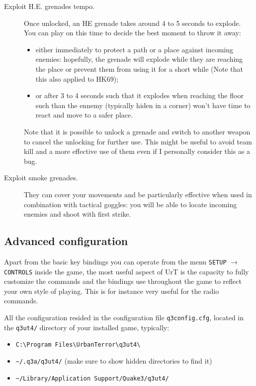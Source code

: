 \begin{description}
\item[Exploit H.E. grenades tempo.] 
  Once unlocked, an HE grenade takes around 4 to 5 seconds to explode. You can
  play on this time to decide the best moment to throw it away:
  \begin{itemize}
  \item either immediately to protect a path or a place against incoming
    enemies: hopefully, the grenade will explode while they are reaching the
    place or prevent them from using it for a short while (Note that this also
    applied to HK69);  
  \item or after 3 to 4 seconds such that it explodes when reaching the floor
    such than the ennemy (typically hiden in a corner) won't have time to react
    and move to a safer place.   
  \end{itemize}
  Note that it is possible to unlock a grenade and switch to another weapon to
  cancel the unlocking for further use. This might be useful to avoid team kill
  and a more effective use of them even if I personally consider this as a bug.    
\item[Exploit smoke grenades.] They can cover your movements and be particularly
  effective when used in combination with tactical goggles: you will be able to
  locate incoming enemies and shoot with first strike.    
\end{description}


\subsection{Advanced configuration}
\label{sec:client:config}

Apart from the basic key bindings you can operate from the menu \texttt{SETUP}
$\rightarrow$ \texttt{CONTROLS} inside the game, the most useful aspect of UrT
is the capacity to fully customize the commands and the bindings use throughout
the game to reflect your own style of playing.  This is for instance very useful
for the radio commands.  

All the configuration resided in the configuration file \texttt{q3config.cfg},
located in the \texttt{q3ut4/} directory of your installed game, typically:
\begin{itemize}
\item[\windows]  \verb!C:\Program Files\UrbanTerror\q3ut4\!
\item[\linux]    \verb!~/.q3a/q3ut4/! (make sure to show hidden
  directories to find it)
\item [\macosx]  \verb!~/Library/Application Support/Quake3/q3ut4/!
\end{itemize}

